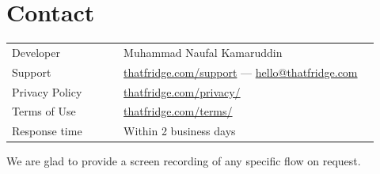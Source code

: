 \documentclass[11pt]{article}
\begin{document}
\section{Contact}

\begin{tabular}{@{}L{0.28\linewidth} L{0.64\linewidth}@{}}
\toprule
Developer      & Muhammad Naufal Kamaruddin \\
Support        & \href{https://thatfridge.com/support}{thatfridge.com/support} ---
                 \href{mailto:hello@thatfridge.com}{hello@thatfridge.com} \\
Privacy Policy & \href{https://thatfridge.com/privacy/}{thatfridge.com/privacy/} \\
Terms of Use   & \href{https://thatfridge.com/terms/}{thatfridge.com/terms/} \\
Response time  & Within 2 business days \\
\bottomrule
\end{tabular}

\vspace{6pt}
We are glad to provide a screen recording of any specific flow on request.
\end{document}
